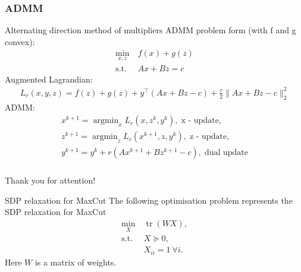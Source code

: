\documentclass[10pt]{beamer}
\DeclareMathOperator{\tr}{tr}
\newcommand{\argmin}{\mathop{\mathrm{argmin}}}
\begin{document}
    \subsubsection{ADMM}
        \begin{frame}{Alternating direction method of multipliers}
            ADMM problem form (with f and g convex):
            \begin{align*}
                \min_{x, z} &~f(x) + g(z)\\
                \text{s.t.} &~Ax + Bz = c
            \end{align*}
            Augmented Lagrandian:
            \begin{align*}
                L_r(x,y,z)=f(z) + g(z) + y^{\top}(Ax + Bz - c) + \frac{r}{2}\| Ax + Bz - c\|^2_2
            \end{align*}
            ADMM:
            \begin{align*}
                x^{k+1}=\argmin_x L_r (x, z^k, y^k), \; \text{x - update},\\
                z^{k+1}=\argmin_z L_r (x^{k+1}, z, y^k), \; \text{z - update},\\
                y^{k+1}=y^k + r (Ax^{k+1} + Bz^{k+1} - c), \; \text{dual update}
            \end{align*}
            
        \end{frame}
		
	
	\begin{frame}
		\frametitle{}
		
		\begin{center}
			{\LARGE Thank you for attention!}
		\end{center}
		
	\end{frame}
	
	\begin{frame}{SDP relaxation for MaxCut}
	    The following optimisation problem represents the SDP relaxation for MaxCut
	    \begin{align*}
	        \min_X &~ \tr(WX),\\
	        \text{s.t.} &~ X \succeq 0,\\
	        &~ X_{ii} = 1 ~\forall i.
	    \end{align*}
	    Here $W$ is a matrix of weights.
	    
	    
	\end{frame}
	
\end{document}
